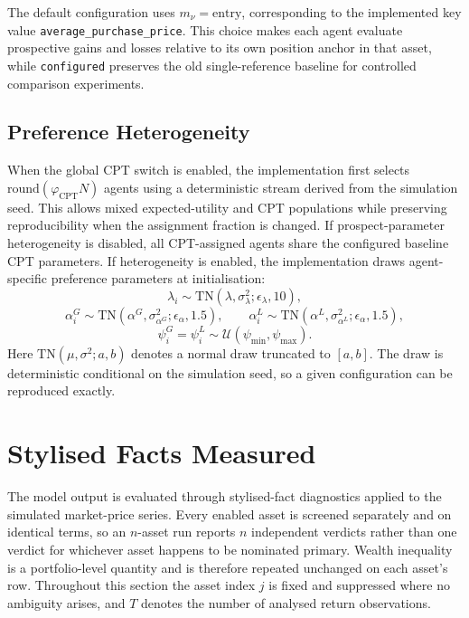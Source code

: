 \documentclass[12pt, a4paper]{article}
\begin{document}
    The default configuration uses \(m_{\nu}=\mathrm{entry}\), corresponding to the
    implemented key value \texttt{average\_purchase\_price}. This choice makes each
    agent evaluate prospective gains and losses relative to its own position
    anchor in that asset, while \texttt{configured} preserves the old
    single-reference baseline for controlled comparison experiments.

    \subsection{Preference Heterogeneity}

    When the global CPT switch is enabled, the implementation first selects
    \(\mathrm{round}(\varphi_{\mathrm{CPT}}N)\) agents using a deterministic stream
    derived from the simulation seed. This allows mixed expected-utility and CPT
    populations while preserving reproducibility when the assignment fraction is
    changed. If prospect-parameter heterogeneity is disabled, all CPT-assigned
    agents share the configured baseline CPT parameters. If heterogeneity is
    enabled, the implementation draws agent-specific preference parameters at
    initialisation:
    \[
        \lambda_i\sim
        \mathrm{TN}\!\left(\lambda,\sigma_\lambda^2;\epsilon_\lambda,10\right),
    \]
    \[
        \alpha_i^G\sim
        \mathrm{TN}\!\left(\alpha^G,\sigma_{\alpha^G}^2;\epsilon_\alpha,1.5\right),
        \qquad
        \alpha_i^L\sim
        \mathrm{TN}\!\left(\alpha^L,\sigma_{\alpha^L}^2;\epsilon_\alpha,1.5\right),
    \]
    \[
        \psi_i^G=\psi_i^L\sim
        \mathcal{U}\!\left(\psi_{\min},\psi_{\max}\right).
    \]
    Here \(\mathrm{TN}(\mu,\sigma^2;a,b)\) denotes a normal draw truncated to
    \([a,b]\). The draw is deterministic conditional on the simulation seed, so a
    given configuration can be reproduced exactly.

    \section{Stylised Facts Measured}\label{sec:stylised_facts}

    The model output is evaluated through stylised-fact diagnostics applied to the
    simulated market-price series. Every enabled asset is screened separately and
    on identical terms, so an \(n\)-asset run reports \(n\) independent verdicts
    rather than one verdict for whichever asset happens to be nominated primary.
    Wealth inequality is a portfolio-level quantity and is therefore repeated
    unchanged on each asset's row. Throughout this section the asset index \(j\)
    is fixed and suppressed where no ambiguity arises, and \(T\) denotes the
    number of analysed return observations.
\end{document}
